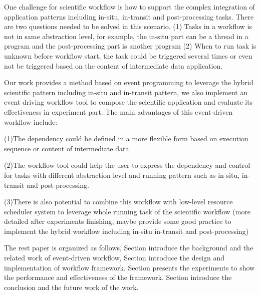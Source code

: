 One challenge for scientific workflow is how to support the complex integration of application patterns including in-situ, in-transit and post-processing tasks\cite{oldfield2014evaluation}. There are two questions needed to be solved in this scenario. (1) Tasks in a workflow is not in same abstraction level, for example, the in-situ part can be a thread in a program and the post-processing part is another program (2) When to run task is unknown before workflow start, the task could be triggered several times or even not be triggered based on the content of intermediate data application.

Our work provides a method based on event programming to leverage the hybrid scientific pattern including in-situ and in-transit pattern, we also implement an event driving workflow tool to compose the scientific application and evaluate its effectiveness in experiment part. The main advantages of this event-driven workflow include:

(1)The dependency could be defined in a more flexible form based on execution sequence or content of intermediate data.

(2)The workflow tool could help the user to express the dependency and control for tasks with different abstraction level and running pattern such as in-situ, in-transit and post-processing.

(3)There is also potential to combine this workflow with low-level resource scheduler system to leverage whole running task of the scientific workflow (more detailed after experiments finishing, maybe provide some good practice to implement the hybrid workflow including in-situ in-transit and post-processing)

The rest paper is organized as follows, Section \uppercase\expandafter{} introduce the background and the related work of event-driven workflow, Section \uppercase\expandafter{} introduce the design and implementation of workflow framework. Section \uppercase\expandafter{} presents the experiments to show the performance and effectiveness of the framework. Section \uppercase\expandafter{} introduce the conclusion and the future work of the work.
